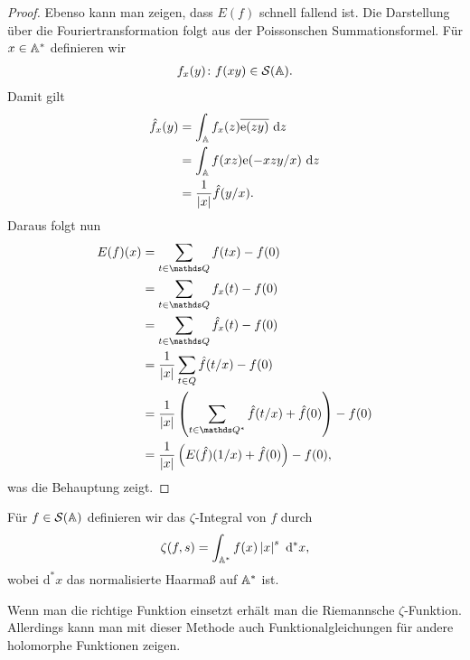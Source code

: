 \begin{proof}
Ebenso kann man zeigen, dass $E(f)$ schnell fallend ist.
Die Darstellung über die Fouriertransformation folgt aus der Poissonschen Summationsformel.
Für $x\in \mathbb{A}^\ast$ definieren wir
\begin{align*}
	f_x(y)\colon f(xy) \in \mathcal{S}(\mathbb{A}).
\end{align*}
Damit gilt
\begin{align*}
	\hat{f}_x(y)&=\int_{\mathbb{A}} f_x(z)\overline{\mathrm{e}(zy)}~\mathrm{d}z\\
	&=\int_{\mathbb{A}} f(xz)\mathrm{e}(-xzy/x)~\mathrm{d}z\\
	&=\frac{1}{\left\vert x\right\vert}\hat{f}(y/x).
\end{align*}
Daraus folgt nun
\begin{align*}
	E(f)(x)&=\sum_{t \in \Q} f(tx)-f(0)\\
	&=\sum_{t\in \Q} f_x(t)-f(0)\\
	&=\sum_{t\in \Q} \hat{f}_x(t)-f(0)\\
	&=\frac{1}{\abs{x}}\sum_{t \in Q} \hat{f}(t/x)-f(0)\\
	&=\frac{1}{\abs{x}}\left(\sum_{t \in \Q^\ast} \hat{f}(t/x)+\hat{f}(0)\right)-f(0)\\
	&=\frac{1}{\abs{x}} \left(E(\hat{f})(1/x)+\hat{f}(0)\right)-f(0),
\end{align*}
was die Behauptung zeigt.
\end{proof}

\begin{defi}
Für $f \in \mathcal{S}(\mathbb{A})$ definieren wir das $\zeta$-Integral von $f$ durch
\begin{align*}
	\zeta(f,s)=\int_{\mathbb{A}^\ast} f(x)\left\vert x\right\vert^s~\mathrm{d}^\ast x,
\end{align*}
wobei $\mathrm{d}^\ast x$ das normalisierte Haarmaß auf $\mathbb{A}^\ast$ ist.
\end{defi}

Wenn man die richtige Funktion einsetzt erhält man die Riemannsche $\zeta$-Funktion.
Allerdings kann man mit dieser Methode auch Funktionalgleichungen für andere holomorphe Funktionen zeigen.

